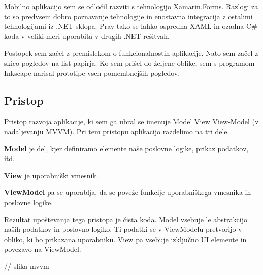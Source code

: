 \documentclass[a4paper, 12pt]{book}
\begin{document}
Mobilno aplikacijo sem se odločil razviti s tehnologijo Xamarin.Forms.
Razlogi za to so predvsem dobro poznavanje tehnologije in enostavna integracija z ostalimi tehnologijami iz .NET sklopa.
Prav tako se lahko ospredna XAML in ozadna C\# koda v veliki meri uporabita v drugih .NET rešitvah.

Postopek sem začel z premislekom o funkcionalnostih aplikacije.
Nato sem začel z skico pogledov na list papirja.
Ko sem prišel do željene oblike, sem s programom Inkscape narisal prototipe vseh pomembnejših pogledov.

\subsection{Pristop}
Pristop razvoja aplikacije, ki sem ga ubral se imenuje Model View View-Model (v nadaljevanju MVVM).
Pri tem pristopu aplikacijo razdelimo na tri dele.

\textbf{Model} je del, kjer definiramo elemente naše poslovne logike, prikaz podatkov, itd.

\textbf{View} je uporabniški vmesnik.

\textbf{ViewModel} pa se uporablja, da se poveže funkcije uporabniškega vmesnika in poslovne logike.

Rezultat upoštevanja tega pristopa je čista koda.
Model vsebuje le abstrakcijo naših podatkov in poslovno logiko.
Ti podatki se v ViewModelu pretvorijo v obliko, ki bo prikazana uporabniku.
View pa vsebuje izključno UI elemente in povezavo na ViewModel.

// slika mvvm

% 
% 
% 
% 
% 
\end{document}
